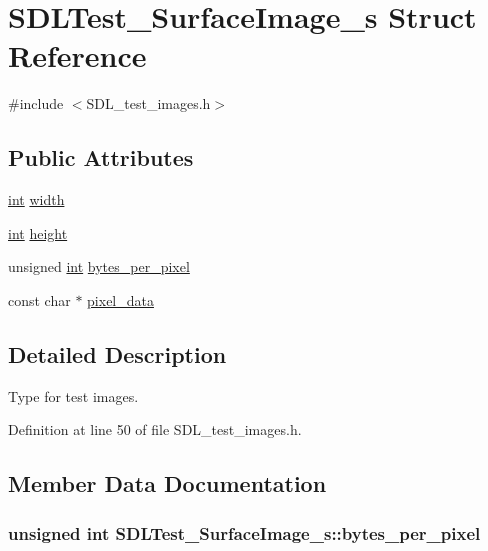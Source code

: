 \hypertarget{struct_s_d_l_test___surface_image__s}{\section{S\-D\-L\-Test\-\_\-\-Surface\-Image\-\_\-s Struct Reference}
\label{struct_s_d_l_test___surface_image__s}
}


{\ttfamily \#include $<$S\-D\-L\-\_\-test\-\_\-images.\-h$>$}

\subsection*{Public Attributes}
\begin{DoxyCompactItemize}
\item 
\hyperlink{_s_d_l__thread_8h_a6a64f9be4433e4de6e2f2f548cf3c08e}{int} \hyperlink{struct_s_d_l_test___surface_image__s_a3cbacf6b015a22832ab4d3f509719609}{width}
\item 
\hyperlink{_s_d_l__thread_8h_a6a64f9be4433e4de6e2f2f548cf3c08e}{int} \hyperlink{struct_s_d_l_test___surface_image__s_a310092874695556e4b7f1f63aec24213}{height}
\item 
unsigned \hyperlink{_s_d_l__thread_8h_a6a64f9be4433e4de6e2f2f548cf3c08e}{int} \hyperlink{struct_s_d_l_test___surface_image__s_a2daf91bab3d79fb9dfa25e8ade43e606}{bytes\-\_\-per\-\_\-pixel}
\item 
const char $\ast$ \hyperlink{struct_s_d_l_test___surface_image__s_acf2d3006bea5690f564d3003d1512fa7}{pixel\-\_\-data}
\end{DoxyCompactItemize}


\subsection{Detailed Description}
Type for test images. 

Definition at line 50 of file S\-D\-L\-\_\-test\-\_\-images.\-h.



\subsection{Member Data Documentation}
\hypertarget{struct_s_d_l_test___surface_image__s_a2daf91bab3d79fb9dfa25e8ade43e606}{
\subsubsection[{bytes\-\_\-per\-\_\-pixel}]{\setlength{\rightskip}{0pt plus 5cm}unsigned {\bf int} S\-D\-L\-Test\-\_\-\-Surface\-Image\-\_\-s\-::bytes\-\_\-per\-\_\-pixel}}\label{struct_s_d_l_test___surface_image__s_a2daf91bab3d79fb9dfa25e8ade43e606}


